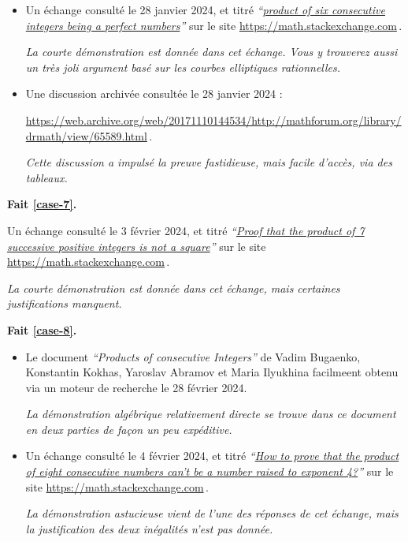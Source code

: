 \begin{itemize}
	\item Un échange consulté le 28 janvier 2024, et titré
\emph{\enquote{\href{https://math.stackexchange.com/q/90894/52365}{product of six consecutive integers being a perfect numbers}}} 
sur le site \url{https://math.stackexchange.com}\,.
	
	\smallskip
	\noindent
	\emph{La courte démonstration est donnée dans cet échange. Vous y trouverez aussi un très joli argument basé sur les courbes elliptiques rationnelles.}


	\item Une discussion archivée consultée le 28 janvier 2024 : 
	
	\noindent
	\url{https://web.archive.org/web/20171110144534/http://mathforum.org/library/drmath/view/65589.html}\,.
	
	\smallskip
	\noindent
	\emph{Cette discussion a impulsé la preuve fastidieuse, mais facile d'accès, via des tableaux.}
\end{itemize}
\vspace{-1ex}




\bigskip
\textbf{Fait \ref{case-7}.}
	
\smallskip
\noindent
Un échange consulté le 3 février 2024, et titré
\emph{\enquote{\href{https://math.stackexchange.com/q/2334887/52365}{Proof that the product of 7 successive positive integers is not a square}}} 
sur le site \url{https://math.stackexchange.com}\,.
	
\smallskip
\noindent
\emph{La courte démonstration est donnée dans cet échange, mais certaines justifications manquent.}




\bigskip
\textbf{Fait \ref{case-8}.}
	
\begin{itemize}
	\item Le document \emph{\enquote{Products of consecutive Integers}} de Vadim Bugaenko, Konstantin Kokhas, Yaroslav Abramov et Maria Ilyukhina facilmeent obtenu via un moteur de recherche le 28 février 2024.
	
	\smallskip
	\noindent
	\emph{La démonstration algébrique relativement directe se trouve dans ce document en deux parties de façon un peu expéditive.}


	\item Un échange consulté le 4 février 2024, et titré \emph{\enquote{\href{https://math.stackexchange.com/a/2271715/52365}{How to prove that the product of eight consecutive numbers can't be a number raised to exponent 4?}}} sur le site \url{https://math.stackexchange.com}\,.

    \smallskip
    \noindent
    \emph{La démonstration astucieuse vient de l'une des réponses de cet échange, mais la justification des deux inégalités n'est pas donnée.}
\end{itemize}
\vspace{-1ex}






